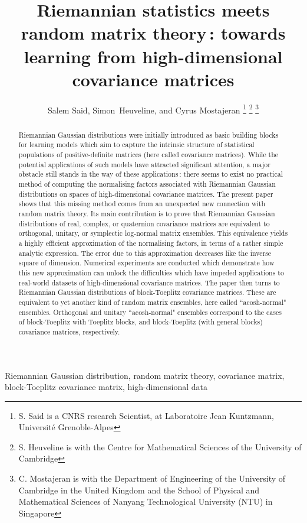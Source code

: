 \documentclass[draftclsnofoot]{IEEEtran}
\begin{document}
\ifCLASSINFOpdf
\else
\fi

\title{Riemannian statistics meets random matrix theory\,: towards learning from high-dimensional covariance matrices}

\author{Salem Said, 
        Simon~Heuveline,
        and Cyrus Mostajeran
\thanks{S. Said is a CNRS research Scientist, at Laboratoire Jean Kuntzmann, Université Grenoble-Alpes}
\thanks{S. Heuveline is with the Centre for Mathematical Sciences of the University of Cambridge}%
\thanks{C. Mostajeran is with the Department of Engineering of the University of Cambridge in the United Kingdom and the School of Physical and Mathematical Sciences of Nanyang Technological University (NTU) in Singapore}}



\maketitle

\begin{abstract}
 Riemannian Gaussian distributions were initially introduced as basic building blocks for learning models which aim to capture the intrinsic structure of statistical populations of positive-definite matrices (here called covariance matrices). While the potential applications of such models have attracted significant attention, a major obstacle still stands in the way of these applications\,: there seems to exist no practical method of computing the normalising factors associated with Riemannian Gaussian distributions on spaces of high-dimensional covariance matrices. The present paper shows that this missing method comes from an unexpected new connection with random matrix theory. Its main contribution is to prove that Riemannian Gaussian distributions of real, complex, or quaternion covariance matrices are equivalent to orthogonal, unitary, or symplectic log-normal matrix ensembles. This equivalence yields a highly efficient approximation of the normalising factors, in terms of a rather simple analytic expression. The error due to this approximation decreases like the inverse square of dimension. Numerical experiments are conducted which demonstrate how this new approximation can unlock the difficulties which have impeded applications to real-world datasets of high-dimensional covariance matrices. The paper then turns to Riemannian Gaussian distributions of block-Toeplitz covariance matrices. These are equivalent to yet another kind of random matrix ensembles, here called ``acosh-normal" ensembles. Orthogonal and unitary ``acosh-normal" ensembles correspond to the cases of block-Toeplitz with Toeplitz blocks, and block-Toeplitz (with general blocks) covariance matrices, respectively.  
\end{abstract}
\begin{IEEEkeywords}
 Riemannian Gaussian distribution, random matrix theory, covariance matrix, block-Toeplitz covariance matrix, high-dimensional data
\end{IEEEkeywords}
\end{document}
